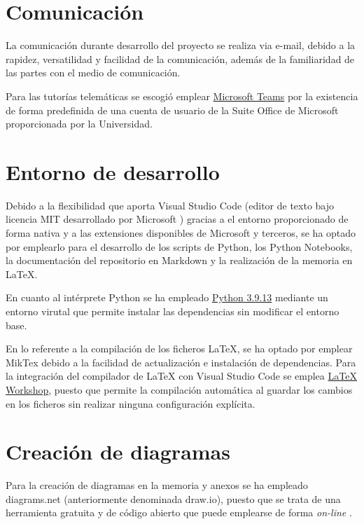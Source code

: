 \section{Comunicación}
La comunicación durante desarrollo del proyecto se realiza via e-mail, debido a la rapidez,
versatilidad y facilidad de la comunicación, además de la familiaridad de las partes con el 
medio de comunicación.

Para las tutorías telemáticas se escogió emplear 
\href{https://www.microsoft.com/es-es/microsoft-teams/log-in}{Microsoft Teams} por la existencia 
de forma predefinida de una cuenta de usuario de la Suite Office de Microsoft proporcionada
por la Universidad.

\section{Entorno de desarrollo}
Debido a la flexibilidad que aporta Visual Studio Code (editor de texto bajo licencia MIT desarrollado por Microsoft \cite{enwiki:vscode2023})
gracias a el entorno proporcionado de forma nativa y a las extensiones disponibles de Microsoft y terceros, se ha optado
por emplearlo para el desarrollo de los scripts de Python, los Python Notebooks, la documentación del repositorio
en Markdown y la realización de la memoria en LaTeX. 

En cuanto al intérprete Python se ha empleado \href{https://www.python.org/downloads/release/python-3913/}{Python 3.9.13} mediante un entorno virutal que permite instalar
las dependencias sin modificar el entorno base.

En lo referente a la compilación de los ficheros LaTeX, se ha optado por emplear 
MikTex debido a la facilidad de actualización e instalación de dependencias.
Para la integración del compilador de LaTeX con Visual Studio Code se emplea 
\href{https://marketplace.visualstudio.com/items?itemName=James-Yu.latex-workshop}{LaTeX Workshop}, 
puesto que permite la compilación automática al guardar los cambios en los ficheros sin realizar
ninguna configuración explícita.

\section{Creación de diagramas}
Para la creación de diagramas en la memoria y anexos se ha empleado diagrams.net (anteriormente 
denominada draw.io), puesto que se trata de una herramienta gratuita y de código abierto que 
puede emplearse de forma \textit{on-line} \cite{misc:wikipediaDiagrams}. 

